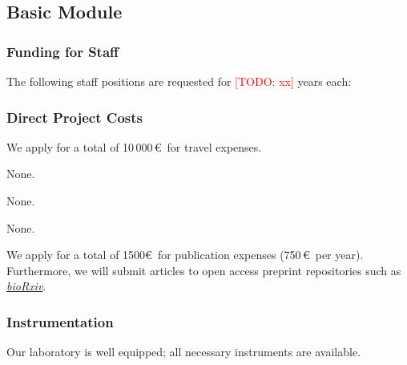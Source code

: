 \documentclass[ngerman,firsttime]{dfgproposal}
\newcommand{\todo}[1]{\xspace{\textcolor{red}{[TODO: #1]}}\xspace}
\begin{document}
	\subsection{Basic Module}
	
	\subsubsection{Funding for Staff}
	\begin{funds}
		The following staff positions are requested for \todo{xx} years each:
		
	\end{funds}
	
	
	\subsubsection{Direct Project Costs}
	\begin{funds}[direct project costs]
		
		
		
		We apply for a total of 10\,000\,\euro\ for travel expenses.
		
		None.
		
		None.
		
		None.
		
		We apply for a total of 1500\euro\ for publication expenses (750\,\euro\ per
		year). Furthermore, we will submit articles to open access preprint repositories
		such as \href{https://www.biorxiv.org/}{\textit{bioRxiv}}.
		
	\end{funds}
	
	\subsubsection{Instrumentation}
	
	Our laboratory is well equipped; all necessary instruments are available.
	
\end{document}
